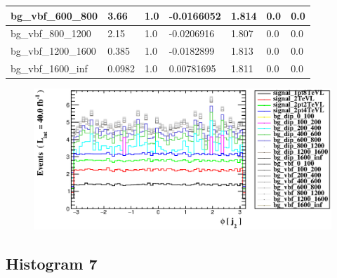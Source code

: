 \documentclass[a4paper, 10pt]{article}
\begin{document}
\begin{table}[H]
\begin{center}
\begin{tabular}{|m{23.0mm}|m{23.0mm}|m{18.0mm}|m{19.0mm}|m{19.0mm}|m{19.0mm}|m{19.0mm}|}
      \hline
      {\cellcolor{white}         bg\_vbf\_600\_800}& {\cellcolor{white}         3.66}& {\cellcolor{white}         1.0}& {\cellcolor{white}         -0.0166052}& {\cellcolor{white}         1.814}& {\cellcolor{green}         0.0}& {\cellcolor{green}         0.0}\\
      \hline
      {\cellcolor{white}         bg\_vbf\_800\_1200}& {\cellcolor{white}         2.15}& {\cellcolor{white}         1.0}& {\cellcolor{white}         -0.0206916}& {\cellcolor{white}         1.807}& {\cellcolor{green}         0.0}& {\cellcolor{green}         0.0}\\
      \hline
      {\cellcolor{white}         bg\_vbf\_1200\_1600}& {\cellcolor{white}         0.385}& {\cellcolor{white}         1.0}& {\cellcolor{white}         -0.0182899}& {\cellcolor{white}         1.813}& {\cellcolor{green}         0.0}& {\cellcolor{green}         0.0}\\
      \hline
      {\cellcolor{white}         bg\_vbf\_1600\_inf}& {\cellcolor{white}         0.0982}& {\cellcolor{white}         1.0}& {\cellcolor{white}         0.00781695}& {\cellcolor{white}         1.811}& {\cellcolor{green}         0.0}& {\cellcolor{green}         0.0}\\
\hline
    \end{tabular}
  \end{center}
\end{table}

\begin{figure}[H]
  \begin{center}
    \includegraphics[scale=0.45]{selection_5.eps}\\
\caption{   }
  \end{center}
\end{figure}
      \newpage
\subsection{ Histogram 7}
\end{document}
